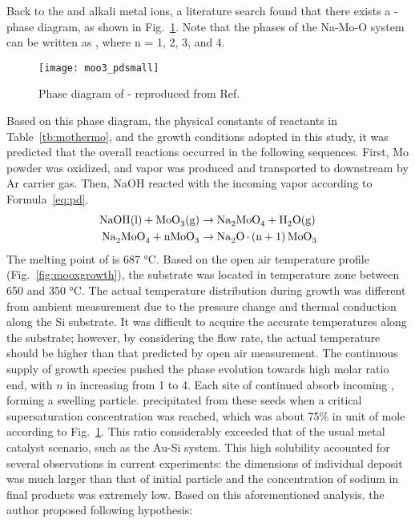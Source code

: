 Back to the  and alkali metal ions, a literature search found that there exists a - phase diagram, as shown in Fig.~\ref{fig:ch4pd}.\cite{Hoermann1929} Note that the phases of the Na-Mo-O system can be written as , where n = 1, 2, 3, and 4. 
\begin{figure}[htb]
\centering
\texttt{[image: moo3\_pdsmall]}
\caption[Phase diagram of  and ]{Phase diagram of - reproduced from Ref.~\cite{Hoermann1929}}
\label{fig:ch4pd}
\end{figure}
Based on this phase diagram, the physical constants of reactants in Table~\ref{tb:mothermo}, and the growth conditions adopted in this study, it was predicted that the overall reactions occurred in the following sequences. First, Mo powder was oxidized, and  vapor was produced and transported to downstream by Ar carrier gas. Then, NaOH reacted with the incoming  vapor according to Formula~\ref{eq:pd}. 
\begin{subequations}\label{eq:pd}
\begin{align}
\cee{NaOH(l) + MoO3(g) &\rightarrow Na2MoO4 + H2O(g)\\
Na2MoO4 + nMoO3   &\rightarrow Na2O.(n + 1)MoO3}
\end{align}
\end{subequations}
The melting point of  is 687 \si{\degreeCelsius}. Based on the open air temperature profile (Fig.~\ref{fig:mooxgrowth}), the substrate was located in temperature zone between 650 and 350 \si{\degreeCelsius}. The actual temperature distribution during growth was different from ambient measurement due to the pressure change and thermal conduction along the Si substrate. It was difficult to acquire the accurate temperatures along the substrate; however, by considering the flow rate, the actual temperature should be higher than that predicted by open air measurement.\cite{Subannajui2010} The continuous supply of  growth species pushed the phase evolution towards high  molar ratio end, with $n$ in  increasing from 1 to 4. Each site of  continued absorb incoming , forming a swelling particle.  precipitated from these seeds when a critical supersaturation concentration was reached, which was about 75\% in unit of mole according to Fig.~\ref{fig:ch4pd}. This ratio considerably exceeded that of the usual metal catalyst scenario, such as the Au-Si system. This high solubility accounted for several observations in current experiments: the dimensions of individual deposit was much larger than that of initial particle and the concentration of sodium in final products was extremely low. Based on this aforementioned analysis, the author proposed following hypothesis:

